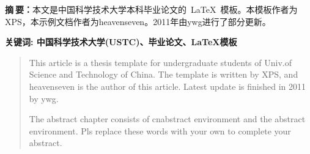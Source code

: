 \begin{cnabstract}
    \sihao\textbf{摘$~$要：}\xiaosihao\fangsong 本文是中国科学技术大学本科毕业论文的~\LaTeX{}~模板。本模板作者为XPS，本示例文档作者为heavenseven。2011年由ywg进行了部分更新。

    \noindent \fangsong\xiaosihao\textbf{关键词: 中国科学技术大学(USTC)、毕业论文、\LaTeX{}模板}
\end{cnabstract}


\begin{abstract}
    This article is a thesis template for undergraduate students of Univ.of Science and Technology of China.
    The template is written by XPS, and heavenseven is the author of this article. Latest update is finished in 2011 by ywg.

    The abstract chapter consists of cnabstract environment and the abstract environment. Pls replace these words with your own to complete your abstract.
\end{abstract}
